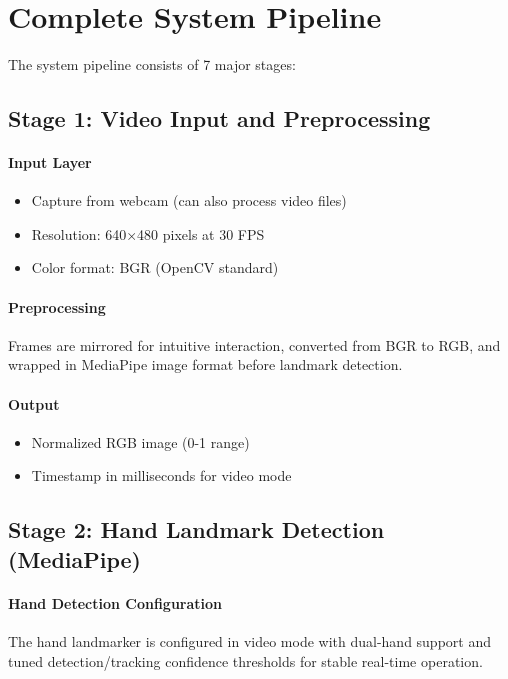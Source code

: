 \section{Complete System Pipeline}

The system pipeline consists of 7 major stages:

\subsection{Stage 1: Video Input and Preprocessing}

\paragraph{Input Layer}
\begin{itemize}
    \item Capture from webcam (can also process video files)
    \item Resolution: 640×480 pixels at 30 FPS
    \item Color format: BGR (OpenCV standard)
\end{itemize}

\paragraph{Preprocessing}
Frames are mirrored for intuitive interaction, converted from BGR to RGB, and wrapped in MediaPipe image format before landmark detection.

\paragraph{Output}
\begin{itemize}
    \item Normalized RGB image (0-1 range)
    \item Timestamp in milliseconds for video mode
\end{itemize}

\subsection{Stage 2: Hand Landmark Detection (MediaPipe)}

\paragraph{Hand Detection Configuration}
The hand landmarker is configured in video mode with dual-hand support and tuned detection/tracking confidence thresholds for stable real-time operation.

